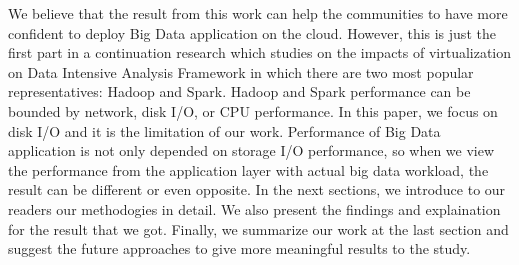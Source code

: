 \documentclass{acmsig}
\begin{document}
We believe that the result from this work can help the communities to have more confident to deploy Big Data application on the cloud. However, this is just the first part in a continuation research which studies on the impacts of virtualization on Data Intensive Analysis Framework in which there are two most popular representatives: Hadoop and Spark. Hadoop and Spark performance can be bounded by network, disk I/O, or CPU performance. In this paper, we focus on disk I/O and it is the limitation of our work. Performance of Big Data application is not only depended on storage I/O performance, so when we view the performance from the application layer with actual big data workload, the result can be different or even opposite. In the next sections, we introduce to our readers our methodogies in detail. We also present the findings and explaination for the result that we got. Finally, we summarize our work at the last section and suggest the future approaches to give more meaningful results to the study.

\end{document}
